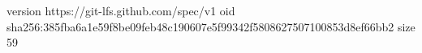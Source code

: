 version https://git-lfs.github.com/spec/v1
oid sha256:385fba6a1e59f8be09feb48c190607e5f99342f5808627507100853d8ef66bb2
size 59
